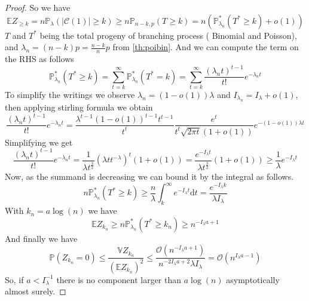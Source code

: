 \begin{proof}
	So we have
	\begin{equation}
		\mathbb{E} Z_{\geq k} = n \mathbb{P}_{\lambda}(|\mathcal{C}(1)| \geq k) \geq n \mathbb{P}_{n-k, p}(T \geq k) 
		= n(\mathbb{P}_{\lambda_n}^*(T^* \geq k) + o(1) )
	\end{equation}
	$T$ and $T^*$ being the total progeny of branching process ( Binomial and Poisson), and $\lambda_n = (n-k)p = \frac{n-k}{n}p$ from \ref{th:poibin}.
	\newline
	And we can compute the term on the RHS as follows
	\begin{equation}
		\mathbb{P}_{\lambda_n}^*(T^* \geq k)
		 = \sum_{t=k}^{\infty} \mathbb{P}_{\lambda_n}^*(T^* = k)
		 = \sum_{t=k}^{\infty} \frac{(\lambda_n t)^{t-1}}{t!} e^{-\lambda_n t}
	\end{equation}
	To simplify the writings we observe $\lambda_n = (1-o(1))\lambda$ and $I_{\lambda_n} = I_{\lambda} + o(1)$, then applying stirling formula we obtain
	\begin{equation}
		\frac{(\lambda_n t)^{t-1}}{t!} e^{-\lambda_n t}
		= \frac{\lambda^{t-1} (1-o(1))^{t-1}t^{t-1}}{t^t} \frac{e^t}{t^t\sqrt{2\pi t}(1 + o(1))} e^{-(1-o(1))\lambda t}	
	\end{equation}
	Simplifying we get
	\begin{equation}
		\frac{(\lambda_n t)^{t-1}}{t!} e^{-\lambda_n t}
		= \frac{1}{\lambda t^{\frac{3}{2}}}(\lambda t t^{-\lambda})^t (1 + o(1))
		= \frac{e^{-I_{\lambda} t }}{\lambda t^{\frac{3}{2}}} (1 + o(1)) \geq \frac{1}{\lambda}e^{-I_{\lambda} t}
	\end{equation}
	Now, as the summand is decreasing we can bound it by the integral as follows.
	\begin{equation}
		n\mathbb{P}_{\lambda_n}^*(T^* \geq k)
		\geq \frac{n}{\lambda} \int_{k}^{\infty} e^{-I_{\lambda} t} \mathrm{d}t
		 = \frac{e^{-I_{\lambda} k}}{\lambda I_{\lambda}}
	\end{equation}
	With $k_n = a\log(n)$ we have 
	\begin{equation}
		\mathbb{E} Z_{k_n} \geq n\mathbb{P}_{\lambda_n}^*(T^* \geq k_n) \geq n^{-I_{\lambda} a + 1}
	\end{equation}
	And finally we have
	\begin{equation}
		\mathbb{P}(Z_{k_n} = 0) \leq \frac{\mathbb{V}Z_{k_n}}{(\mathbb{E}Z_{k_n})^2} \leq \frac{\mathcal{O}(n^{-I_{\lambda}a + 1})}{n^{-2I_{\lambda}a + 2} \lambda I_{\lambda}} 
			= \mathcal{O}(n^{I_{\lambda}a - 1})
	\end{equation}
	So, if $a<I_{\lambda}^{-1}$ there is no component larger than $a\log(n)$ asymptotically almost surely.
\end{proof}
